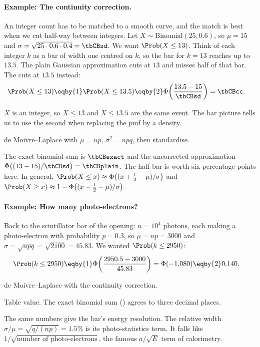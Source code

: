 \paragraph{Example: The continuity correction.}
\label{2b:ex:continuity}
An integer count has to be matched to a smooth curve, and the match is best when we cut half-way between integers. Let $X\sim\text{Binomial}(25,0.6)$, so $\mu=15$ and $\sigma=\sqrt{25\cdot0.6\cdot0.4}=\tbCBsd$. We want $\Prob(X\le13)$. Think of each integer $k$ as a bar of width one centred on $k$, so the bar for $k=13$ reaches up to $13.5$. The plain Gaussian approximation cuts at $13$ and misses half of that bar. The  cuts at $13.5$ instead:
\begin{align*}
  \Prob(X\le13)
  &\eqby{1} \Prob(X\le13.5)
  \eqby{2} \Phi\!\left(\frac{13.5-15}{\tbCBsd}\right)
  = \tbCBcc .
\end{align*}
\begin{explain}
  \item $X$ is an integer, so $X\le13$ and $X\le13.5$ are the same event. The bar picture tells us to use the second when replacing the pmf by a density.
  \item de Moivre--Laplace with $\mu=np$, $\sigma^2=npq$, then standardise.
\end{explain}
The exact binomial sum is $\tbCBexact$ and the uncorrected approximation $\Phi\bigl((13-15)/\tbCBsd\bigr)=\tbCBplain$. The half-bar is worth six percentage points here. In general, $\Prob(X\le x)\approx\Phi\bigl((x+\tfrac12-\mu)/\sigma\bigr)$ and $\Prob(X\ge x)\approx1-\Phi\bigl((x-\tfrac12-\mu)/\sigma\bigr)$.

\paragraph{Example: How many photo-electrons?}
Back to the scintillator bar of the opening: $n=10^4$ photons, each making a photo-electron with probability $p=0.3$, so $\mu=np=3000$ and $\sigma=\sqrt{npq}=\sqrt{2100}=45.83$. We wanted $\Prob(k\le2950)$:
\begin{align*}
  \Prob(k\le2950)
  &\eqby{1}\Phi\!\left(\frac{2950.5-3000}{45.83}\right)
  =\Phi(-1.080)
  \eqby{2}0.140 .
\end{align*}
\begin{explain}
  \item de Moivre--Laplace with the continuity correction.
  \item Table value. The exact binomial sum () agrees to three decimal places.
\end{explain}
The same numbers give the bar's energy resolution. The relative width $\sigma/\mu=\sqrt{q/(np)}=1.5\%$ is its photo-statistics term. It falls like $1/\sqrt{\text{number of photo-electrons}}$, the famous $a/\sqrt E$ term of calorimetry.

